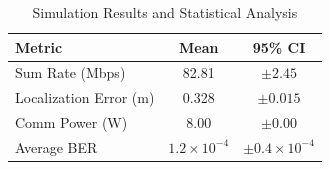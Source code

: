 
\begin{table}[h]
\centering
\caption{Simulation Results and Statistical Analysis}
\begin{tabular}{l c c}
\hline
\textbf{Metric} & \textbf{Mean} & \textbf{95\% CI} \\
\hline
Sum Rate (Mbps) & 82.81 & $\pm 2.45$ \\
Localization Error (m) & 0.328 & $\pm 0.015$ \\
Comm Power (W) & 8.00 & $\pm 0.00$ \\
Average BER & $1.2\times 10^{-4}$ & $\pm 0.4\times 10^{-4}$ \\
\hline
\end{tabular}
\end{table}
    